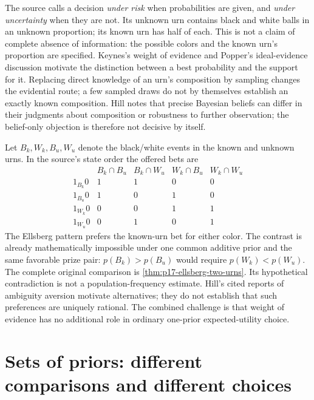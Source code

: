 The source calls a decision \emph{under risk} when probabilities are
given, and \emph{under uncertainty} when they are not. Its unknown urn
contains black and white balls in an unknown proportion; its known urn
has half of each. This is not a claim of complete absence of information:
the possible colors and the known urn's proportion are specified.
Keynes's weight of evidence and Popper's ideal-evidence discussion motivate
the distinction between a best probability and the support for it.
Replacing direct knowledge of an urn's composition by sampling changes
the evidential route; a few sampled draws do not by themselves establish
an exactly known composition.
Hill notes that precise Bayesian beliefs can differ in their judgments
about composition or robustness to further observation; the belief-only
objection is therefore not decisive by itself.
\cite[Sec.~1 and notes~1--2, pp.~495--496, 503]{Hill2021DecisionUncertainty}

Let \(B_k,W_k,B_u,W_u\) denote the black/white events in the known
and unknown urns. In the source's state order the offered bets are
\[
\begin{array}{c|rrrr}
 &B_k\cap B_u&B_k\cap W_u&W_k\cap B_u&W_k\cap W_u\\\hline
 1_{B_k}0&1&1&0&0\\
 1_{B_u}0&1&0&1&0\\
 1_{W_k}0&0&0&1&1\\
 1_{W_u}0&0&1&0&1
\end{array}
\]
The Ellsberg pattern prefers the known-urn bet for either color. The
contrast is already mathematically impossible under one common additive
prior and the same favorable prize pair: \(p(B_k)>p(B_u)\) would
require \(p(W_k)<p(W_u)\). The complete original comparison is
\cref{thm:p17-ellsberg-two-urns}. Its hypothetical contradiction is not
a population-frequency estimate. Hill's cited reports of ambiguity
aversion motivate alternatives; they do not establish that such preferences
are uniquely rational. The combined challenge is that weight of evidence
has no additional role in ordinary one-prior expected-utility choice.

\section{Sets of priors: different comparisons and different choices}
\label{sec:p17-rat84-multiple-priors}


